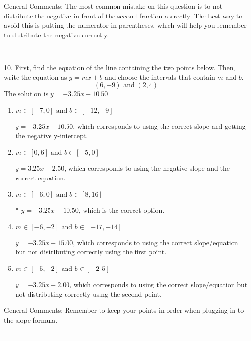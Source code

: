 \documentclass{article}[14pt]
\begin{document}
General Comments: The most common mistake on this question is to not distribute the negative in front of the second fraction correctly. The best way to avoid this is putting the numerator in parentheses, which will help you remember to distribute the negative correctly.

-----------------------------------------------

10. First, find the equation of the line containing the two points below. Then, write the equation as $ y=mx+b $ and choose the intervals that contain $m$ and $b$.
$$ (6, -9) \text{ and } (2, 4) $$ 
The solution is $ y = -3.25x + 10.50 $ 

\begin{enumerate}[label=\Alph*.] 
\item $ m \in [-7, 0] \text{ and } b \in [-12, -9] $ 

  $y = -3.25x - 10.50$, which corresponds to using the correct slope and getting the negative y-intercept. 
\item $ m \in [0, 6] \text{ and } b \in [-5, 0] $ 

  $y = 3.25x - 2.50$, which corresponds to using the negative slope and the correct equation. 
\item $ m \in [-6, 0] \text{ and } b \in [8, 16] $ 

 * $y = -3.25x + 10.50$, which is the correct option. 
\item $ m \in [-6, -2] \text{ and } b \in [-17, -14] $ 

  $y = -3.25x - 15.00$, which corresponds to using the correct slope/equation but not distributing correctly using the first point. 
\item $ m \in [-5, -2] \text{ and } b \in [-2, 5] $ 

  $y = -3.25x + 2.00$, which corresponds to using the correct slope/equation but not distributing correctly using the second point. 
\end{enumerate} 
 
General Comments: Remember to keep your points in order when plugging in to the slope formula.

-----------------------------------------------
\end{document}

